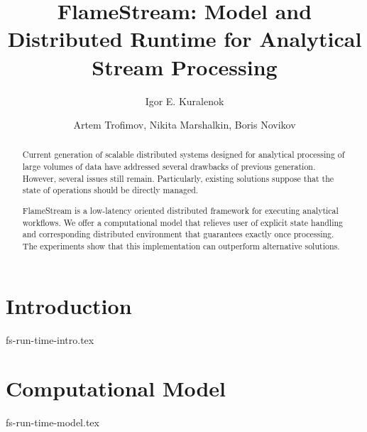 \documentclass[sigconf]{acmart-edbt2018}
\begin{document}
\title {FlameStream: Model and Distributed Runtime for Analytical Stream Processing}


\author{Igor E. Kuralenok}

\author{Artem Trofimov, Nikita Marshalkin, Boris Novikov}


\begin{abstract}
Current generation of scalable distributed systems designed for analytical processing of large volumes of data have addressed several drawbacks of previous generation. However, several issues still remain. Particularly, existing solutions suppose that the state of operations should be directly managed.

FlameStream is a low-latency oriented distributed framework for executing analytical workflows. We offer a computational model that relieves user of explicit state handling and corresponding distributed environment that guarantees exactly once processing. The experiments show that this implementation can outperform alternative solutions.
\end {abstract}

\maketitle


\section {Introduction}
 {fs-run-time-intro.tex}

\section {Computational Model}
 {fs-run-time-model.tex}
\end{document}
